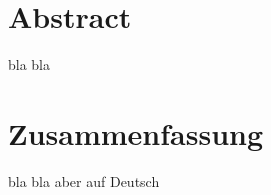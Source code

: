 %
%
\thispagestyle{empty}
%
\vspace*{1cm}
\section*{Abstract}

bla bla

\vspace*{2.2cm}
\section*{Zusammenfassung}

bla bla aber auf Deutsch

%
